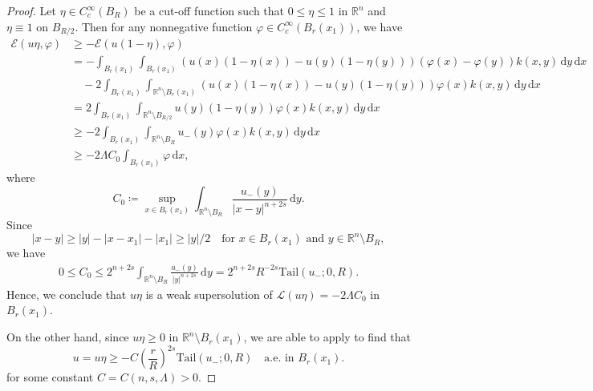 \documentclass[10pt,a4paper]{amsart}
\begin{document}
\begin{proof}
Let $\eta \in C^\infty_c(B_{R})$ be a cut-off function such that $0 \leq \eta \leq 1$ in $\mathbb{R}^n$ and $\eta \equiv 1$ on $B_{R/2}$. Then for any nonnegative function $\varphi \in C^\infty_c(B_r(x_1))$, we have
\begin{align*}
\mathcal{E}(u\eta, \varphi)
&\geq - \mathcal{E}(u(1-\eta), \varphi) \\
&= - \int_{B_r(x_1)} \int_{B_r(x_1)} (u(x)(1-\eta(x)) - u(y)(1-\eta(y)))(\varphi(x) -\varphi(y)) k(x, y)\,\mathrm{d}y \,\mathrm{d}x \\
&\quad - 2 \int_{B_r(x_1)} \int_{\mathbb{R}^n \setminus B_r(x_1)} (u(x)(1-\eta(x)) - u(y)(1-\eta(y))) \varphi(x) k(x, y) \,\mathrm{d}y \,\mathrm{d}x \\
&= 2 \int_{B_r(x_1)} \int_{\mathbb{R}^n \setminus B_{R/2}} u(y)(1-\eta(y))\varphi(x) k(x, y) \,\mathrm{d}y \,\mathrm{d}x \\
&\geq -2 \int_{B_r(x_1)} \int_{\mathbb{R}^n \setminus B_{R}} u_-(y) \varphi(x) k(x, y) \,\mathrm{d}y \,\mathrm{d}x \\
&\geq -2\Lambda C_0 \int_{B_r(x_1)} \varphi \,\mathrm{d}x,
\end{align*}
where
\begin{equation*}
C_0 \coloneqq \sup_{x \in B_r(x_1)} \int_{\mathbb{R}^n \setminus B_{R}} \frac{u_-(y)}{|x-y|^{n+2s}} \,\mathrm{d}y.
\end{equation*}
Since
\begin{equation*}
|x-y| \geq |y| - |x-x_1|-|x_1| \geq |y|/2 \quad \text{for $x \in B_r(x_1)$ and $y \in \mathbb{R}^n \setminus B_{R}$},
\end{equation*}
 we have
\begin{align*}
0 \leq C_0
\leq  2^{n+2s} \int_{\mathbb{R}^n \setminus B_{R}} \frac{u_-(y)}{|y|^{n+2s}} \,\mathrm{d}y=2^{n+2s} R^{-2s}\mathrm{Tail}(u_-; 0, R).
\end{align*}
Hence, we conclude that $u\eta$ is a weak supersolution of $\mathcal{L}(u\eta) = -2\Lambda C_0$ in $B_r(x_1)$.

On the other hand, since $u\eta \geq 0$ in $\mathbb{R}^n \setminus B_r(x_1)$, we are able to apply  to find that
\begin{equation*}
    u=u\eta \geq -C\left(\frac{r}{R}\right)^{2s}\mathrm{Tail}(u_-; 0, R) \quad \text{a.e.\ in $B_r(x_1)$}.
\end{equation*}
for some constant $C=C(n, s, \Lambda)>0$.
\end{proof}
\end{document}
